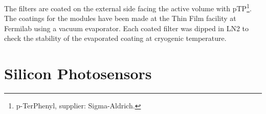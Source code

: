 The filters are coated on the external side facing the \lar active volume with pTP\footnote{p-TerPhenyl, supplier: Sigma-Aldrich\textregistered.}.  The coatings for the  modules have been made at the Thin Film facility at Fermilab using a vacuum evaporator. Each coated filter was dipped in LN2 to check the stability of the evaporated coating at cryogenic temperature. 






\section{Silicon Photosensors}
\label{sec:fdsp-pd-ps}


